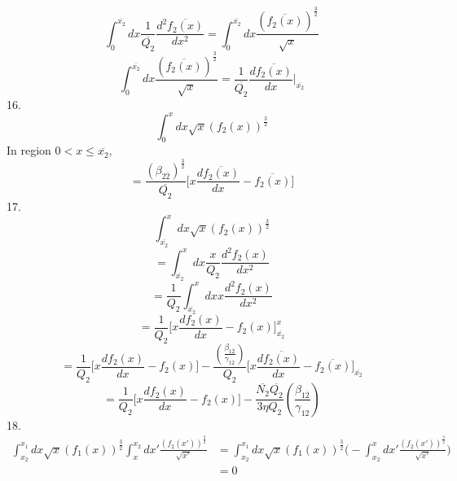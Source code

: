 \documentclass[fleqn, 10pt]{article}
\begin{document}
\begin{equation*}
    \int^{\overline{x_2}}_0 dx \frac{1}{\overline{Q_2}}\frac{d^2\overline{f_2(x)}}{dx^2} = \int^{\overline{x_2}}_0 dx \frac{(\overline{f_2(x)})^\frac{3}{2}}{\sqrt{x}}
\end{equation*}
\begin{equation}
    \int^{\overline{x_2}}_0 dx \frac{(\overline{f_2(x)})^\frac{3}{2}}{\sqrt{x}} =  \frac{1}{\overline{Q_2}} \frac{d\overline{f_2(x)}}{dx}\Bigg|_{\overline{x_2}}
    \label{44}
\end{equation}
 16. 
                \begin{equation*}
                    \int^{x}_0 dx \sqrt{x} (f_2(x))^\frac{3}{2}
                \end{equation*}
                In region $0<x\leq \overline{x_2}$, 
                \begin{equation}
                    = \frac{(\beta_{2\overline{2}})^\frac{3}{2}}{\overline{Q_2}} \Biggl[x \frac{d\overline{f_2(x)}}{dx} - \overline{f_2(x)} \Biggr]
                    \label{78}
                \end{equation}
17. 
\begin{equation*}
   \int^{x}_{\overline{x_2}} dx \sqrt{x} (f_2(x))^\frac{3}{2}
\end{equation*}
\begin{equation*}
   = \int^{x}_{\overline{x_2}} dx \frac{x}{Q_2} \frac{d^2f_2(x)}{dx^2}
\end{equation*}
\begin{equation*}
    = \frac{1}{Q_2} \int^{x}_{\overline{x_2}} dx x \frac{d^2f_2(x)}{dx^2}
\end{equation*}
\begin{equation*}
    = \frac{1}{Q_2} \biggl[ x \frac{df_2(x)}{dx} - f_2(x) \biggr]^{x}_{\overline{x_2}}
\end{equation*}
\begin{equation*}
    = \frac{1}{Q_2} \biggl[ x \frac{df_2(x)}{dx} - f_2(x) \biggr] - \frac{\left(\frac{\beta_{1\overline{2}}}{\gamma_{12}}\right)}{Q_2} \biggl[ x \frac{d\overline{f_2(x)}}{dx} - \overline{f_2(x)} \biggr]_{\overline{x_2}} 
\end{equation*}
\begin{equation}
  = \frac{1}{Q_2} \biggl[ x \frac{df_2(x)}{dx} - f_2(x) \biggr] - \frac{\overline{N_{2}}\overline{Q_{2}}}{3\eta Q_2}\left(\frac{\beta_{1\overline{2}}}{\gamma_{12}}\right)
    \label{56}
\end{equation}
 18. 
                \begin{equation}
                    \begin{split}
                        \int^{x_1}_{x_2} dx \sqrt{x} (f_1(x))^\frac{3}{2} \int^{x_2}_{x} dx' \frac{(f_2(x'))^\frac{3}{2}}{\sqrt{x'}} & = \int^{x_1}_{x_2} dx \sqrt{x} (f_1(x))^\frac{3}{2} \biggl( - \int^{x}_{x_2} dx' \frac{(f_2(x'))^\frac{3}{2}}{\sqrt{x'}} \Biggr) \\ & = 0
                    \end{split}
                    \label{76}
                \end{equation}
\end{document}
